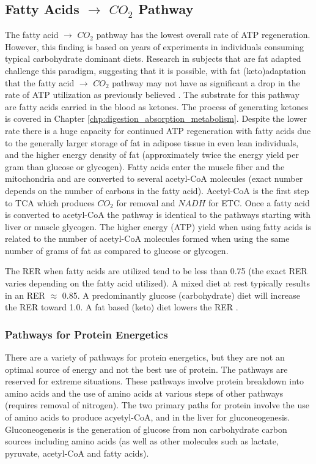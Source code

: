 \subsection{Fatty Acids $\rightarrow$ $CO_2$ Pathway}

The fatty acid $\rightarrow$ $CO_2$ pathway has the lowest overall rate of ATP regeneration. However, this finding is based on years of experiments in individuals consuming typical carbohydrate dominant diets. Research in subjects that are fat adapted challenge this paradigm, suggesting that it is possible, with fat (keto)adaptation that the fatty acid $\rightarrow$ $CO_2$ pathway may not have as significant a drop in the rate of ATP utilization as previously believed \cite{mcswiney_keto-adaptation_2018}. The substrate for this pathway are fatty acids carried in the blood as ketones. The process of generating ketones is covered in Chapter \ref{chp:digestion_absorption_metabolism}. Despite the lower rate there is a huge capacity for continued ATP regeneration with fatty acids due to the generally larger storage of fat in adipose tissue in even lean individuals, and the higher energy density of fat (approximately twice the energy yield per gram than glucose or glycogen). Fatty acids enter the muscle fiber and the mitochondria and are converted to several acetyl-CoA molecules (exact number depends on the number of carbons in the fatty acid). Acetyl-CoA is the first step to TCA which produces $CO_2$ for removal and $NADH$ for ETC. Once a fatty acid is converted to acetyl-CoA the pathway is identical to the pathways starting with liver or muscle glycogen. The higher energy (ATP) yield when using fatty acids is related to the number of acetyl-CoA molecules formed when using the same number of grams of fat as compared to glucose or glycogen. 

The RER when fatty acids are utilized tend to be less than 0.75 (the exact RER varies depending on the fatty acid utilized). A mixed diet at rest typically results in an RER $\approx$ 0.85. A predominantly glucose (carbohydrate) diet will increase the RER toward 1.0. A fat based (keto) diet lowers the RER \cite{alessandro_effects_2015}.

\subsubsection{Pathways for Protein Energetics}

There are a variety of pathways for protein energetics, but they are not an optimal source of energy and not the best use of protein. The pathways are reserved for extreme situations. These pathways involve protein breakdown into amino acids and the use of amino acids at various steps of other pathways (requires removal of nitrogen). The two primary paths for protein involve the use of amino acids to produce acyetyl-CoA, and in the liver for gluconeogenesis. Gluconeogenesis is the generation of glucose from non carbohydrate carbon sources including amino acids (as well as other molecules such as lactate, pyruvate, acetyl-CoA and fatty acids).


